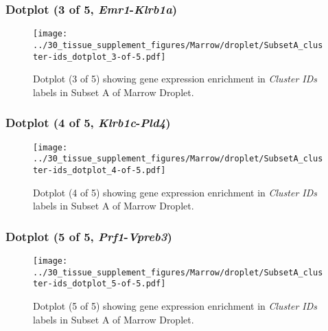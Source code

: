 \clearpage

\subsubsection{Dotplot (3 of 5, \emph{Emr1}-\emph{Klrb1a})}
\begin{figure}[h]
\centering
\texttt{[image: ../30\_tissue\_supplement\_figures/Marrow/droplet/SubsetA\_cluster-ids\_dotplot\_3-of-5.pdf]}

\caption{ Dotplot (3 of 5)  showing gene expression enrichment in \emph{Cluster IDs} labels in Subset A of Marrow Droplet. }
\end{figure}


\clearpage

\subsubsection{Dotplot (4 of 5, \emph{Klrb1c}-\emph{Pld4})}
\begin{figure}[h]
\centering
\texttt{[image: ../30\_tissue\_supplement\_figures/Marrow/droplet/SubsetA\_cluster-ids\_dotplot\_4-of-5.pdf]}

\caption{ Dotplot (4 of 5)  showing gene expression enrichment in \emph{Cluster IDs} labels in Subset A of Marrow Droplet. }
\end{figure}


\clearpage

\subsubsection{Dotplot (5 of 5, \emph{Prf1}-\emph{Vpreb3})}
\begin{figure}[h]
\centering
\texttt{[image: ../30\_tissue\_supplement\_figures/Marrow/droplet/SubsetA\_cluster-ids\_dotplot\_5-of-5.pdf]}

\caption{ Dotplot (5 of 5)  showing gene expression enrichment in \emph{Cluster IDs} labels in Subset A of Marrow Droplet. }
\end{figure}

